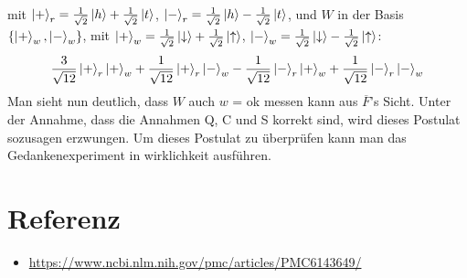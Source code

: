 \documentclass[a4paper]{article}
\begin{document}
mit $\ket{+}_{r} = \frac{1}{\sqrt{2}} \ket{h} + \frac{1}{\sqrt{2}} \ket{t}$, $\ket{-}_{r} = \frac{1}{\sqrt{2}} \ket{h} - \frac{1}{\sqrt{2}} \ket{t}$,
und $W$ in der Basis $\qty{\ket{+}_{w}, \ket{-}_{w}}$,
mit $\ket{+}_{w} = \frac{1}{\sqrt{2}} \ket{\downarrow} + \frac{1}{\sqrt{2}} \ket{\uparrow}$, $\ket{-}_{w} = \frac{1}{\sqrt{2}} \ket{\downarrow} - \frac{1}{\sqrt{2}} \ket{\uparrow}$:
\begin{align*}
\frac{3}{\sqrt{12}}\ket{+}_{r}\ket{+}_{w} + \frac{1}{\sqrt{12}}\ket{+}_{r}\ket{-}_{w} - \frac{1}{\sqrt{12}}\ket{-}_{r}\ket{+}_{w} + \frac{1}{\sqrt{12}}\ket{-}_{r}\ket{-}_{w}
\end{align*}
Man sieht nun deutlich, dass $W$ auch $w$ = ok messen kann aus $\overline{F}$'s Sicht.
Unter der Annahme, dass die Annahmen Q, C und S korrekt sind, wird dieses Postulat sozusagen erzwungen.
Um dieses Postulat zu überprüfen kann man das Gedankenexperiment in wirklichkeit ausführen.

\section*{Referenz}
\begin{itemize}
	\item \url{https://www.ncbi.nlm.nih.gov/pmc/articles/PMC6143649/}
\end{itemize}
\end{document}
